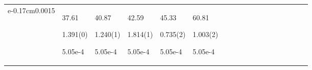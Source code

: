 \begin{longtable}{|p{0.01cm}|p{0.25cm}p{0.25cm}p{0.25cm}p{0.25cm}p{0.25cm}p{0.25cm}p{0.25cm}p{0.25cm}p{0.25cm}p{0.25cm}p{0.25cm}p{0.25cm}p{0.25cm}p{0.25cm}p{0.25cm}p{0.25cm}p{0.25cm}|}
e{-0.17cm}0.0015}} & \par{\tiny \parbox{1cm}{\hspace{-0.17cm}37.61}}\par{\tiny \parbox{1cm}{\hspace{-0.17cm}1.391(0)}}\par{\tiny \parbox{1cm}{\hspace{-0.17cm}5.05e-4}} & \par{\tiny \parbox{1cm}{\hspace{-0.17cm}40.87}}\par{\tiny \parbox{1cm}{\hspace{-0.17cm}1.240(1)}}\par{\tiny \parbox{1cm}{\hspace{-0.17cm}5.05e-4}} & \par{\tiny \parbox{1cm}{\hspace{-0.17cm}42.59}}\par{\tiny \parbox{1cm}{\hspace{-0.17cm}1.814(1)}}\par{\tiny \parbox{1cm}{\hspace{-0.17cm}5.05e-4}} & \par{\tiny \parbox{1cm}{\hspace{-0.17cm}45.33}}\par{\tiny \parbox{1cm}{\hspace{-0.17cm}0.735(2)}}\par{\tiny \parbox{1cm}{\hspace{-0.17cm}5.05e-4}} & \par{\tiny \parbox{1cm}{\hspace{-0.17cm}60.81}}\par{\tiny \parbox{1cm}{\hspace{-0.17cm}1.003(2)}}\par{\tiny \parbox{1cm}{\hspace{-0.17cm}5.05e-4}}\\

\end{longtable}
